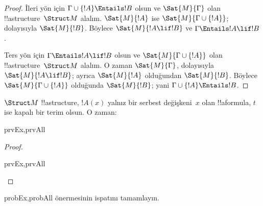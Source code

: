 \begin{proof}
İleri yön için $\Gamma\cup\{!A\}\Entails !B$ olsun ve
$\Sat{M}{\Gamma}$ olan !!a{structure}~$\Struct M$ alalım.
$\Sat{M}{!A}$ ise $\Sat{M}{\Gamma\cup\{!A\}}$; dolayısıyla
$\Sat{M}{!B}$. Böylece $\Sat{M}{!A\lif !B}$ ve
$\Gamma\Entails !A\lif !B$.

Ters yön için $\Gamma\Entails !A\lif !B$ olsun ve
$\Sat{M}{\Gamma\cup\{!A\}}$ olan !!a{structure}~$\Struct M$ alalım.
O zaman $\Sat{M}{\Gamma}$, dolayısıyla $\Sat{M}{!A\lif !B}$; ayrıca
$\Sat{M}{!A}$ olduğundan $\Sat{M}{!B}$. Böylece
$\Sat{M}{\Gamma\cup\{!A\}}$ olduğunda $\Sat{M}{!B}$; yani
$\Gamma\cup\{!A\}\Entails !B$.
\end{proof}

\begin{prop}
  $\Struct M$ !!a{structure}, $!A(x)$ yalnız bir serbest değişkeni~$x$
  olan !!a{formula}, $t$ ise kapalı bir terim olsun. O zaman:
  \begin{tagenumerate}{prvEx,prvAll}
  \end{tagenumerate}
\end{prop}

\begin{proof}
  \begin{tagenumerate}{prvEx,prvAll}
  \end{tagenumerate}
\end{proof}

\begin{probtag}{probEx,probAll}
   önermesinin ispatını
  tamamlayın.
\end{probtag}

